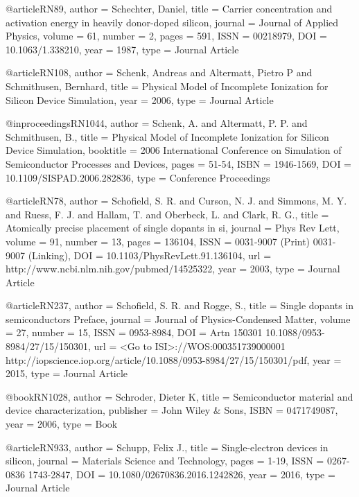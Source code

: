 @article{RN89,
   author = {Schechter, Daniel},
   title = {Carrier concentration and activation energy in heavily donor-doped silicon},
   journal = {Journal of Applied Physics},
   volume = {61},
   number = {2},
   pages = {591},
   ISSN = {00218979},
   DOI = {10.1063/1.338210},
   year = {1987},
   type = {Journal Article}
}

@article{RN108,
   author = {Schenk, Andreas and Altermatt, Pietro P and Schmithusen, Bernhard},
   title = {Physical Model of Incomplete Ionization for Silicon Device Simulation},
   year = {2006},
   type = {Journal Article}
}

@inproceedings{RN1044,
   author = {Schenk, A. and Altermatt, P. P. and Schmithusen, B.},
   title = {Physical Model of Incomplete Ionization for Silicon Device Simulation},
   booktitle = {2006 International Conference on Simulation of Semiconductor Processes and Devices},
   pages = {51-54},
   ISBN = {1946-1569},
   DOI = {10.1109/SISPAD.2006.282836},
   type = {Conference Proceedings}
}

@article{RN78,
   author = {Schofield, S. R. and Curson, N. J. and Simmons, M. Y. and Ruess, F. J. and Hallam, T. and Oberbeck, L. and Clark, R. G.},
   title = {Atomically precise placement of single dopants in si},
   journal = {Phys Rev Lett},
   volume = {91},
   number = {13},
   pages = {136104},
   ISSN = {0031-9007 (Print)
0031-9007 (Linking)},
   DOI = {10.1103/PhysRevLett.91.136104},
   url = {http://www.ncbi.nlm.nih.gov/pubmed/14525322},
   year = {2003},
   type = {Journal Article}
}

@article{RN237,
   author = {Schofield, S. R. and Rogge, S.},
   title = {Single dopants in semiconductors Preface},
   journal = {Journal of Physics-Condensed Matter},
   volume = {27},
   number = {15},
   ISSN = {0953-8984},
   DOI = {Artn 150301
10.1088/0953-8984/27/15/150301},
   url = {<Go to ISI>://WOS:000351739000001
http://iopscience.iop.org/article/10.1088/0953-8984/27/15/150301/pdf},
   year = {2015},
   type = {Journal Article}
}

@book{RN1028,
   author = {Schroder, Dieter K},
   title = {Semiconductor material and device characterization},
   publisher = {John Wiley & Sons},
   ISBN = {0471749087},
   year = {2006},
   type = {Book}
}

@article{RN933,
   author = {Schupp, Felix J.},
   title = {Single-electron devices in silicon},
   journal = {Materials Science and Technology},
   pages = {1-19},
   ISSN = {0267-0836
1743-2847},
   DOI = {10.1080/02670836.2016.1242826},
   year = {2016},
   type = {Journal Article}
}

